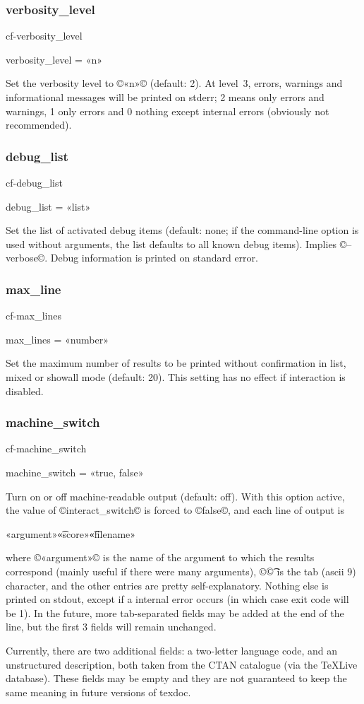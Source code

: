 \documentclass[a4paper, oneside]{scrartcl}
\makeatletter
\newcommand\texlive{%
  \TeX\thinspace Live\xspace}
\newif\ifframed
\newenvironment{cmdsubsub}[2]{%
  \framedfalse \commandes\subsubsection{#1}{#2}%
  }{%
  \endcommandes}
\newenvironment{htcode}{%
  \SaveVerbatim[samepage, gobble=2]{verbmat}%
  }{%
  \endSaveVerbatim
  \par\medskip\noindent\hspace*{\parindent}%
  \BUseVerbatim{verbmat}%
  \par\medskip\@endpetrue}
\makeatother
\begin{document}
\begin{cmdsubsub}{verbosity_level}{cf-verbosity_level}
  verbosity_level = «n»
\end{cmdsubsub}

Set the verbosity level to ©«n»© (default: 2). At level~3, errors, warnings and
informational messages will be printed on stderr; 2 means only errors and
warnings, 1 only errors and 0 nothing except internal errors (obviously not
recommended).

\begin{cmdsubsub}{debug_list}{cf-debug_list}
  debug_list = «list»
\end{cmdsubsub}

Set the list of activated debug items (default: none; if the command-line
option is used without arguments, the list defaults to all known debug items).
Implies ©--verbose©. Debug information is printed on standard error.

\begin{cmdsubsub}{max_line}{cf-max_lines}
  max_lines = «number»
\end{cmdsubsub}

Set the maximum number of results to be printed without confirmation in list,
mixed or showall mode (default: 20). This setting has no effect if interaction
is disabled.

\begin{cmdsubsub}{machine_switch}{cf-machine_switch}
  machine_switch = «true, false»
\end{cmdsubsub}

Turn on or off machine-readable output (default: off).  With this option
active, the value of ©interact_switch© is forced to ©false©, and each line of
output is
\begin{htcode}
  «argument»\t«score»\t«filename»
\end{htcode}
where ©«argument»© is the name of the argument to which the results correspond
(mainly useful if there were many arguments), ©\t© is the tab (ascii 9)
character, and the other entries are pretty self-explanatory. Nothing else is
printed on stdout, except if a internal error occurs (in which case exit code
will be 1). In the future, more tab-separated fields may be added at the end
of the line, but the first 3 fields will remain unchanged.

Currently, there are two additional fields: a two-letter language code, and an
unstructured description, both taken from the CTAN catalogue (via the \texlive
database). These fields may be empty and they are not guaranteed to keep the
same meaning in future versions of texdoc.
\end{document}
